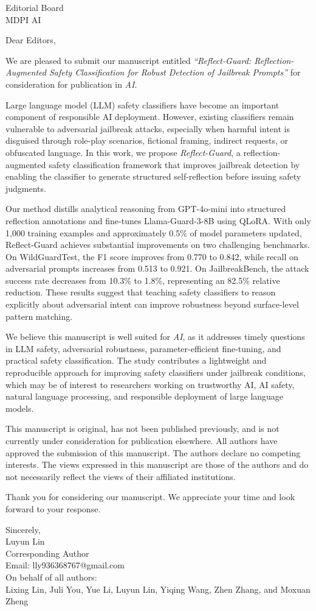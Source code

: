 \documentclass[12pt]{article}
\begin{document}
\noindent
Editorial Board\\
MDPI AI
\vspace{0.5cm}

\noindent
Dear Editors,

\vspace{0.5cm}


We are pleased to submit our manuscript entitled 
\textit{``Reflect-Guard: Reflection-Augmented Safety Classification for Robust Detection of Jailbreak Prompts''} 
for consideration for publication in \textit{AI}.

Large language model (LLM) safety classifiers have become an important component of responsible AI deployment. However, existing classifiers remain vulnerable to adversarial jailbreak attacks, especially when harmful intent is disguised through role-play scenarios, fictional framing, indirect requests, or obfuscated language. In this work, we propose \textit{Reflect-Guard}, a reflection-augmented safety classification framework that improves jailbreak detection by enabling the classifier to generate structured self-reflection before issuing safety judgments.

Our method distills analytical reasoning from GPT-4o-mini into structured reflection annotations and fine-tunes Llama-Guard-3-8B using QLoRA. With only 1,000 training examples and approximately 0.5\% of model parameters updated, Reflect-Guard achieves substantial improvements on two challenging benchmarks. On WildGuardTest, the F1 score improves from 0.770 to 0.842, while recall on adversarial prompts increases from 0.513 to 0.921. On JailbreakBench, the attack success rate decreases from 10.3\% to 1.8\%, representing an 82.5\% relative reduction. These results suggest that teaching safety classifiers to reason explicitly about adversarial intent can improve robustness beyond surface-level pattern matching.

We believe this manuscript is well suited for \textit{AI}, as it addresses timely questions in LLM safety, adversarial robustness, parameter-efficient fine-tuning, and practical safety classification. The study contributes a lightweight and reproducible approach for improving safety classifiers under jailbreak conditions, which may be of interest to researchers working on trustworthy AI, AI safety, natural language processing, and responsible deployment of large language models.

This manuscript is original, has not been published previously, and is not currently under consideration for publication elsewhere. All authors have approved the submission of this manuscript. The authors declare no competing interests. The views expressed in this manuscript are those of the authors and do not necessarily reflect the views of their affiliated institutions.

Thank you for considering our manuscript. We appreciate your time and look forward to your response.


Sincerely,\\
Luyun Lin\\
Corresponding Author\\
Email: lly936368767@gmail.com\\[1em]

On behalf of all authors:\\
Lixing Lin, Juli You, Yue Li, Luyun Lin, Yiqing Wang, Zhen Zhang, and Moxuan Zheng
\end{document}
